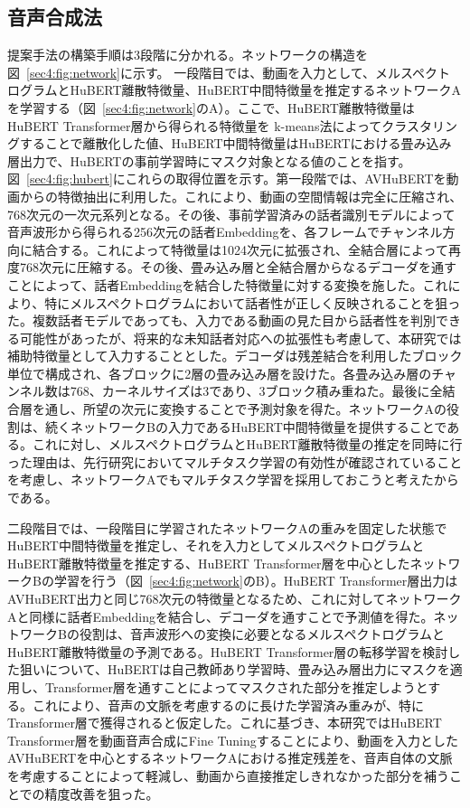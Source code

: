 \documentclass[12pt]{jarticle}
\numberwithin{equation}{section}    %
\numberwithin{figure}{section}      %
\numberwithin{table}{section}      %
\begin{document}
\subsection{音声合成法}
提案手法の構築手順は3段階に分かれる。ネットワークの構造を図~\ref{sec4:fig:network}に示す。
一段階目では、動画を入力として、メルスペクトログラムとHuBERT離散特徴量、HuBERT中間特徴量を推定するネットワークAを学習する（図~\ref{sec4:fig:network}のA）。ここで、HuBERT離散特徴量はHuBERT Transformer層から得られる特徴量を k-means法によってクラスタリングすることで離散化した値、HuBERT中間特徴量はHuBERTにおける畳み込み層出力で、HuBERTの事前学習時にマスク対象となる値のことを指す。図~\ref{sec4:fig:hubert}にこれらの取得位置を示す。第一段階では、AVHuBERTを動画からの特徴抽出に利用した。これにより、動画の空間情報は完全に圧縮され、768次元の一次元系列となる。その後、事前学習済みの話者識別モデル\cite{wan2018generalized}によって音声波形から得られる256次元の話者Embeddingを、各フレームでチャンネル方向に結合する。これによって特徴量は1024次元に拡張され、全結合層によって再度768次元に圧縮する。その後、畳み込み層と全結合層からなるデコーダを通すことによって、話者Embeddingを結合した特徴量に対する変換を施した。これにより、特にメルスペクトログラムにおいて話者性が正しく反映されることを狙った。複数話者モデルであっても、入力である動画の見た目から話者性を判別できる可能性があったが、将来的な未知話者対応への拡張性も考慮して、本研究では補助特徴量として入力することとした。デコーダは残差結合を利用したブロック単位で構成され、各ブロックに2層の畳み込み層を設けた。各畳み込み層のチャンネル数は768、カーネルサイズは3であり、3ブロック積み重ねた。最後に全結合層を通し、所望の次元に変換することで予測対象を得た。ネットワークAの役割は、続くネットワークBの入力であるHuBERT中間特徴量を提供することである。これに対し、メルスペクトログラムとHuBERT離散特徴量の推定を同時に行った理由は、先行研究においてマルチタスク学習の有効性が確認されていることを考慮し、ネットワークAでもマルチタスク学習を採用しておこうと考えたからである。

二段階目では、一段階目に学習されたネットワークAの重みを固定した状態でHuBERT中間特徴量を推定し、それを入力としてメルスペクトログラムとHuBERT離散特徴量を推定する、HuBERT Transformer層を中心としたネットワークBの学習を行う（図~\ref{sec4:fig:network}のB）。HuBERT Transformer層出力はAVHuBERT出力と同じ768次元の特徴量となるため、これに対してネットワークAと同様に話者Embeddingを結合し、デコーダを通すことで予測値を得た。ネットワークBの役割は、音声波形への変換に必要となるメルスペクトログラムとHuBERT離散特徴量の予測である。HuBERT Transformer層の転移学習を検討した狙いについて、HuBERTは自己教師あり学習時、畳み込み層出力にマスクを適用し、Transformer層を通すことによってマスクされた部分を推定しようとする。これにより、音声の文脈を考慮するのに長けた学習済み重みが、特にTransformer層で獲得されると仮定した。これに基づき、本研究ではHuBERT Transformer層を動画音声合成にFine Tuningすることにより、動画を入力としたAVHuBERTを中心とするネットワークAにおける推定残差を、音声自体の文脈を考慮することによって軽減し、動画から直接推定しきれなかった部分を補うことでの精度改善を狙った。
\end{document}
